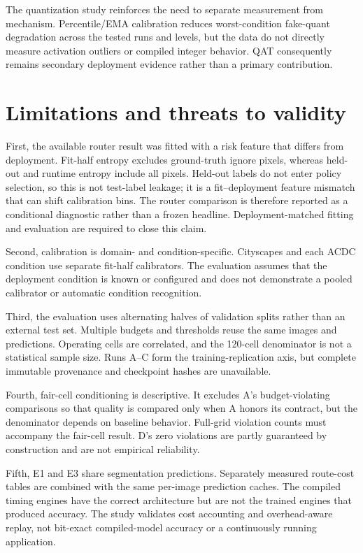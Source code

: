 \documentclass[a4paper,review,12pt]{elsarticle}
\begin{document}
The quantization study reinforces the need to separate measurement from mechanism. Percentile/EMA calibration reduces worst-condition fake-quant degradation across the tested runs and levels, but the data do not directly measure activation outliers or compiled integer behavior. QAT consequently remains secondary deployment evidence rather than a primary contribution.

\section{Limitations and threats to validity}
\label{sec:limitations}

First, the available router result was fitted with a risk feature that differs from deployment. Fit-half entropy excludes ground-truth ignore pixels, whereas held-out and runtime entropy include all pixels. Held-out labels do not enter policy selection, so this is not test-label leakage; it is a fit--deployment feature mismatch that can shift calibration bins. The router comparison is therefore reported as a conditional diagnostic rather than a frozen headline. Deployment-matched fitting and evaluation are required to close this claim.

Second, calibration is domain- and condition-specific. Cityscapes and each ACDC condition use separate fit-half calibrators. The evaluation assumes that the deployment condition is known or configured and does not demonstrate a pooled calibrator or automatic condition recognition.

Third, the evaluation uses alternating halves of validation splits rather than an external test set. Multiple budgets and thresholds reuse the same images and predictions. Operating cells are correlated, and the 120-cell denominator is not a statistical sample size. Runs A--C form the training-replication axis, but complete immutable provenance and checkpoint hashes are unavailable.

Fourth, fair-cell conditioning is descriptive. It excludes A's budget-violating comparisons so that quality is compared only when A honors its contract, but the denominator depends on baseline behavior. Full-grid violation counts must accompany the fair-cell result. D's zero violations are partly guaranteed by construction and are not empirical reliability.

Fifth, E1 and E3 share segmentation predictions. Separately measured route-cost tables are combined with the same per-image prediction caches. The compiled timing engines have the correct architecture but are not the trained engines that produced accuracy. The study validates cost accounting and overhead-aware replay, not bit-exact compiled-model accuracy or a continuously running application.
\end{document}
